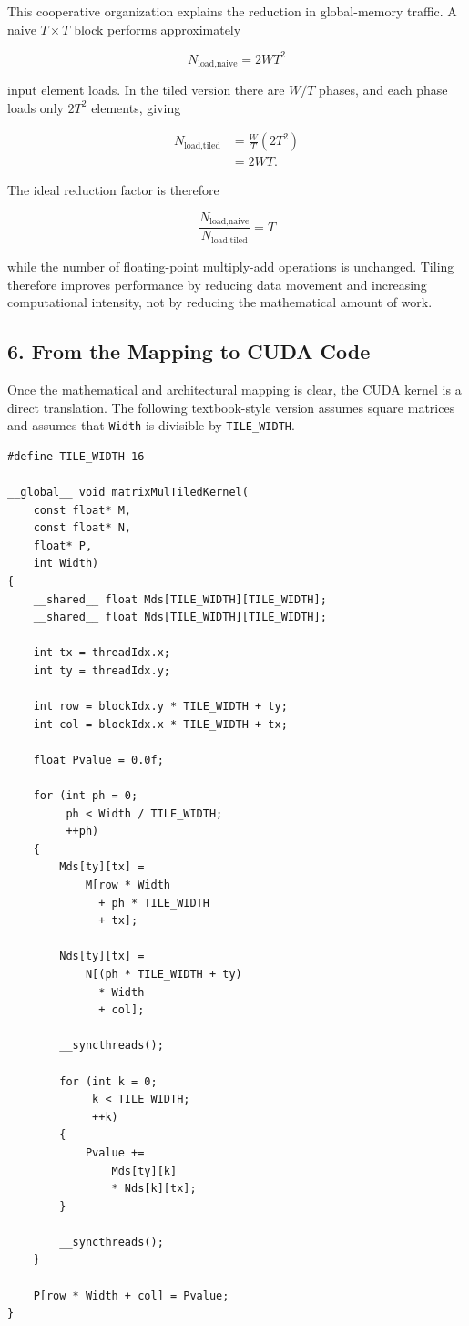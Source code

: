 \documentclass[11pt,a4paper]{article}
\begin{document}
This cooperative organization explains the reduction in global-memory traffic. A naive $T\times T$ block performs approximately

\[
    N_{\text{load,naive}} = 2WT^2
\]

input element loads. In the tiled version there are $W/T$ phases, and each phase loads only $2T^2$ elements, giving

\[
\begin{aligned}
N_{\text{load,tiled}}
&=
\frac{W}{T}(2T^2) \\
&=
2WT.
\end{aligned}
\]

The ideal reduction factor is therefore

\[
\boxed{
\frac{N_{\text{load,naive}}}
     {N_{\text{load,tiled}}}
=T
}
\]

while the number of floating-point multiply-add operations is unchanged. Tiling therefore improves performance by reducing data movement and increasing computational intensity, not by reducing the mathematical amount of work.

\subsection{6. From the Mapping to CUDA Code}

Once the mathematical and architectural mapping is clear, the CUDA kernel is a direct translation. The following textbook-style version assumes square matrices and assumes that \texttt{Width} is divisible by \texttt{TILE\_WIDTH}.

\begin{lstlisting}
#define TILE_WIDTH 16

__global__ void matrixMulTiledKernel(
    const float* M,
    const float* N,
    float* P,
    int Width)
{
    __shared__ float Mds[TILE_WIDTH][TILE_WIDTH];
    __shared__ float Nds[TILE_WIDTH][TILE_WIDTH];

    int tx = threadIdx.x;
    int ty = threadIdx.y;

    int row = blockIdx.y * TILE_WIDTH + ty;
    int col = blockIdx.x * TILE_WIDTH + tx;

    float Pvalue = 0.0f;

    for (int ph = 0;
         ph < Width / TILE_WIDTH;
         ++ph)
    {
        Mds[ty][tx] =
            M[row * Width
              + ph * TILE_WIDTH
              + tx];

        Nds[ty][tx] =
            N[(ph * TILE_WIDTH + ty)
              * Width
              + col];

        __syncthreads();

        for (int k = 0;
             k < TILE_WIDTH;
             ++k)
        {
            Pvalue +=
                Mds[ty][k]
                * Nds[k][tx];
        }

        __syncthreads();
    }

    P[row * Width + col] = Pvalue;
}
\end{lstlisting}
\end{document}
